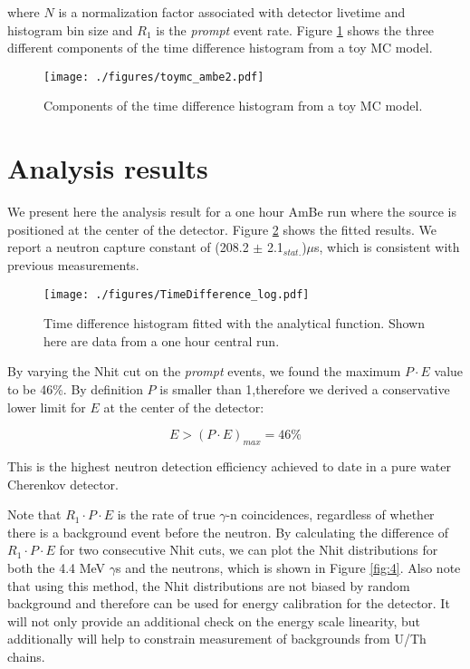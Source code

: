 \documentclass[a4paper]{jpconf}
\begin{document}
where $N$ is a normalization factor associated with detector livetime and histogram bin size and $R_{1}$ is the \textit{prompt} event rate. Figure \ref{fig:2} shows the three different components of the time difference histogram from a toy MC model.

\begin{figure}[h]
\begin{center}
\texttt{[image: ./figures/toymc\_ambe2.pdf]}
\end{center}
\caption{\label{fig:2}Components of the time difference histogram from a toy MC model.}
\end{figure}

\section{Analysis results}

We present here the analysis result for a one hour AmBe run where the source is positioned at the center of the detector. Figure \ref{fig:3} shows the fitted results. We report a neutron capture constant of (208.2 $\pm$ 2.1$_{\textit{stat.}}$)$\mu$s, which is consistent with previous measurements\cite{Super-Kamiokande:2015xra}\cite{Cokinos:1977zz}.

\begin{figure}[h]
\begin{center}
\texttt{[image: ./figures/TimeDifference\_log.pdf]}
\end{center}
\caption{\label{fig:3}Time difference histogram fitted with the analytical function. Shown here are data from a one hour central run.}
\end{figure}

By varying the Nhit cut on the \textit{prompt} events, we found the maximum $P \cdot E$ value to be 46\%. By definition $P$ is smaller than 1,therefore we derived a conservative lower limit for $E$ at the center of the detector:

\begin{equation}
E > (P \cdot E)_{max} = 46\%
\end{equation}

This is the highest neutron detection efficiency achieved to date in a pure water Cherenkov detector.

Note that $R_1 \cdot P \cdot E$ is the rate of true $\gamma$-n coincidences, regardless of whether there is a background event before the neutron. By calculating the difference of $R_1 \cdot P \cdot E$ for two consecutive Nhit cuts, we can plot the Nhit distributions for both the 4.4 MeV $\gamma$s and the neutrons, which is shown in Figure \ref{fig:4}. Also note that using this method, the Nhit distributions are not biased by random background and therefore can be used for energy calibration for the detector. It will not only provide an additional check on the energy scale linearity, but additionally will help to constrain measurement of backgrounds from U/Th chains. 
\end{document}
